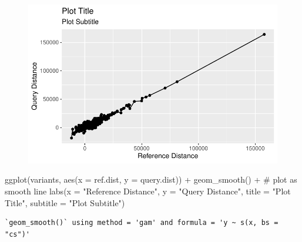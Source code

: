\documentclass[
  letterpaper,
  DIV=11,
  numbers=noendperiod]{scrreprt}
\newenvironment{Shaded}{\begin{snugshade}}{\end{snugshade}}
\newcommand{\AttributeTok}[1]{\textcolor[rgb]{0.40,0.45,0.13}{#1}}
\newcommand{\CommentTok}[1]{\textcolor[rgb]{0.37,0.37,0.37}{#1}}
\newcommand{\FunctionTok}[1]{\textcolor[rgb]{0.28,0.35,0.67}{#1}}
\newcommand{\NormalTok}[1]{\textcolor[rgb]{0.00,0.23,0.31}{#1}}
\newcommand{\SpecialCharTok}[1]{\textcolor[rgb]{0.37,0.37,0.37}{#1}}
\newcommand{\StringTok}[1]{\textcolor[rgb]{0.13,0.47,0.30}{#1}}
\begin{document}
\begin{figure}[H]

{\centering \includegraphics{scripts/02_dataViz/class3_files/figure-pdf/unnamed-chunk-12-1.pdf}

}

\end{figure}

\begin{Shaded}
\begin{Highlighting}[]
\FunctionTok{ggplot}\NormalTok{(variants, }\FunctionTok{aes}\NormalTok{(}\AttributeTok{x =}\NormalTok{ ref.dist, }\AttributeTok{y =}\NormalTok{ query.dist)) }\SpecialCharTok{+}
  \FunctionTok{geom\_smooth}\NormalTok{() }\SpecialCharTok{+} \CommentTok{\# plot as smooth line}
  \FunctionTok{labs}\NormalTok{(}\AttributeTok{x =} \StringTok{"Reference Distance"}\NormalTok{,}
       \AttributeTok{y =} \StringTok{"Query Distance"}\NormalTok{,}
       \AttributeTok{title =} \StringTok{"Plot Title"}\NormalTok{,}
       \AttributeTok{subtitle =} \StringTok{"Plot Subtitle"}\NormalTok{)}
\end{Highlighting}
\end{Shaded}

\begin{verbatim}
`geom_smooth()` using method = 'gam' and formula = 'y ~ s(x, bs = "cs")'
\end{verbatim}
\end{document}
